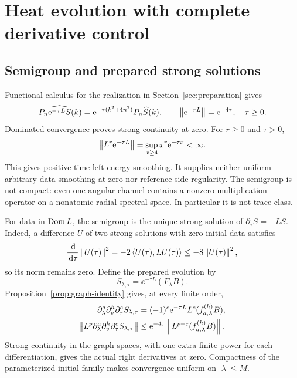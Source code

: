 \section{Heat evolution with complete derivative control}
\label{sec:heat}

\subsection{Semigroup and prepared strong solutions}

Functional calculus for the realization in Section~\ref{sec:preparation}
gives
\begin{equation}
 P_n\widehat{\mathrm e^{-\tau L}S}(k)
 =\mathrm e^{-\tau(k^2+4n^2)}P_n\widehat S(k),\qquad
 \left\lVert\mathrm e^{-\tau L}\right\rVert=\mathrm e^{-4\tau},\quad \tau\ge0.
 \label{eq:semigroup}
\end{equation}
Dominated convergence proves strong continuity at zero. For $r\ge0$ and
$\tau>0$,
\begin{equation}
 \left\lVert L^r\mathrm e^{-\tau L}\right\rVert
 =\sup_{x\ge4}x^r\mathrm e^{-\tau x}<\infty.
 \label{eq:smoothing}
\end{equation}
This gives positive-time left-energy smoothing. It supplies neither
uniform arbitrary-data smoothing at zero nor reference-side regularity.
The semigroup is not compact: even one angular channel contains a
nonzero multiplication operator on a nonatomic radial spectral space.
In particular it is not trace class.

For data in $\operatorname{Dom} L$, the semigroup is the unique strong solution of
$\partial_\tau S=-LS$. Indeed, a difference $U$ of two strong solutions
with zero initial data satisfies
\begin{equation*}
 \frac{\,\mathrm d}{\,\mathrm d\tau}\left\lVert U(\tau)\right\rVert^2
 =-2\left\langle U(\tau),LU(\tau)\right\rangle
 \le-8\left\lVert U(\tau)\right\rVert^2,
\end{equation*}
so its norm remains zero. Define the prepared evolution by
\begin{equation}
 S_{\lambda,\tau}=\ee^{-\tau L}(F_\lambda B).
 \label{eq:evolved-field}
\end{equation}
Proposition~\ref{prop:graph-identity} gives, at every finite order,
\begin{align}
 \partial_\lambda^a\partial_v^h\partial_\tau^cS_{\lambda,\tau}
 &=(-1)^c\mathrm e^{-\tau L}L^c(f_{a,\lambda}^{(h)}B),
 \label{eq:graph-evolution}\\
 \left\lVert L^p\partial_\lambda^a\partial_v^h\partial_\tau^cS_{\lambda,\tau}\right\rVert
 &\le\mathrm e^{-4\tau}\left\lVert L^{p+c}(f_{a,\lambda}^{(h)}B)\right\rVert.
 \label{eq:graph-evolution-bound}
\end{align}
Strong continuity in the graph spaces, with one extra finite power for
each differentiation, gives the actual right derivatives at zero.
Compactness of the parameterized initial family makes convergence
uniform on $|\lambda|\le M$.

